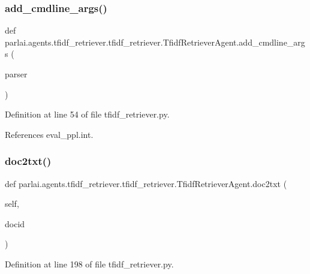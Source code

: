 \subsubsection{\texorpdfstring{add\+\_\+cmdline\+\_\+args()}{add\_cmdline\_args()}}
{\footnotesize\ttfamily def parlai.\+agents.\+tfidf\+\_\+retriever.\+tfidf\+\_\+retriever.\+Tfidf\+Retriever\+Agent.\+add\+\_\+cmdline\+\_\+args (\begin{DoxyParamCaption}\item[{}]{parser }\end{DoxyParamCaption})\hspace{0.3cm}{\ttfamily [static]}}



Definition at line 54 of file tfidf\+\_\+retriever.\+py.



References eval\+\_\+ppl.\+int.

\mbox{\label{classparlai_1_1agents_1_1tfidf__retriever_1_1tfidf__retriever_1_1TfidfRetrieverAgent_af3dec5fd8d3fb89229f00d919bfcd565}} 
\subsubsection{\texorpdfstring{doc2txt()}{doc2txt()}}
{\footnotesize\ttfamily def parlai.\+agents.\+tfidf\+\_\+retriever.\+tfidf\+\_\+retriever.\+Tfidf\+Retriever\+Agent.\+doc2txt (\begin{DoxyParamCaption}\item[{}]{self,  }\item[{}]{docid }\end{DoxyParamCaption})}



Definition at line 198 of file tfidf\+\_\+retriever.\+py.



